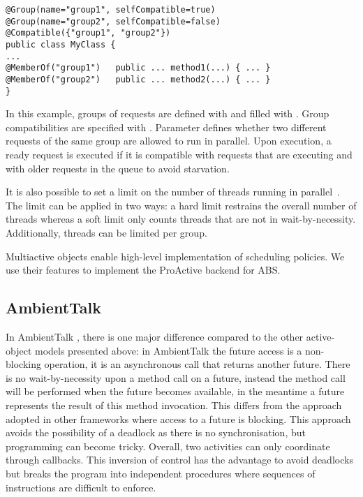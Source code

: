 \setlength\abovecaptionskip{0.25mm}
\begin{lstlisting}
@Group(name="group1", selfCompatible=true)
@Group(name="group2", selfCompatible=false)
@Compatible({"group1", "group2"})
public class MyClass {
...
@MemberOf("group1")   public ... method1(...) { ... }
@MemberOf("group2")   public ... method2(...) { ... }
}
\end{lstlisting}
In this example, groups of requests are defined with  and filled with
. Group compatibilities are specified with
. Parameter  defines
whether two different requests of the same group are allowed to run in
parallel.  Upon execution, a ready request is executed if it is
compatible with requests that are executing and with older
requests in the queue to avoid starvation.  


It is also possible to set a limit on the number of threads running in
parallel~\cite{henrio:hal-00916293}.  The limit can be applied in two ways: a hard limit
restrains the overall number of threads whereas a soft limit only counts threads that are
not in wait-by-necessity.  Additionally, threads can be limited per group.

Multiactive objects enable high-level implementation of scheduling policies. We use their 
features to implement the ProActive backend for ABS.


\subsection{AmbientTalk}
In AmbientTalk \cite{DedeckerCMDM-ecoop06}, there is one major difference compared to the 
other active-object models presented above: in AmbientTalk the future access is a
non-blocking operation, it is an asynchronous call that returns
another future.  There is no wait-by-necessity upon a method call on a
future, instead the method call will be performed when the future
becomes available, in the meantime a future represents the result of
this method invocation.  This differs from the approach adopted in
other frameworks where access to a future is blocking.  This approach
avoids the possibility of a deadlock as there is no synchronisation,
but programming can become tricky.
Overall, two activities can only coordinate through  callbacks.  This
inversion of control has the advantage to avoid deadlocks but breaks the program into
independent procedures where sequences of instructions are difficult to enforce.



